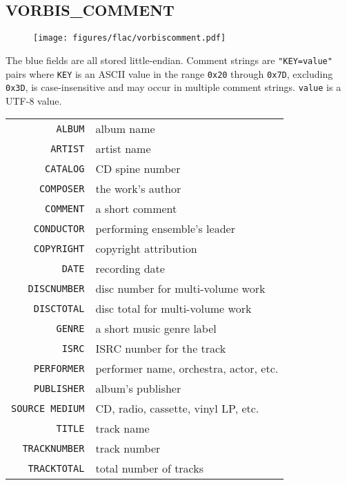 \subsection{VORBIS\_COMMENT}
\begin{figure}[h]
\texttt{[image: figures/flac/vorbiscomment.pdf]}
\end{figure}
\par
\noindent
The blue fields are all stored little-endian.
Comment strings are \texttt{"KEY=value"} pairs
where \texttt{KEY} is an ASCII value in the range \texttt{0x20}
through \texttt{0x7D}, excluding \texttt{0x3D},
is case-insensitive and may occur in multiple comment strings.
\texttt{value} is a UTF-8 value.
\begin{table}[h]
  {
    \begin{tabular}{rl}
      \texttt{ALBUM} & album name \\
      \texttt{ARTIST} & artist name \\
      \texttt{CATALOG} & CD spine number \\
      \texttt{COMPOSER} & the work's author \\
      \texttt{COMMENT} & a short comment \\
      \texttt{CONDUCTOR} & performing ensemble's leader \\
      \texttt{COPYRIGHT} & copyright attribution \\
      \texttt{DATE} & recording date \\
      \texttt{DISCNUMBER} & disc number for multi-volume work \\
      \texttt{DISCTOTAL} & disc total for multi-volume work \\
      \texttt{GENRE} & a short music genre label \\
      \texttt{ISRC} & ISRC number for the track \\
      \texttt{PERFORMER} & performer name, orchestra, actor, etc. \\
      \texttt{PUBLISHER} & album's publisher \\
      \texttt{SOURCE MEDIUM} & CD, radio, cassette, vinyl LP, etc. \\
      \texttt{TITLE} & track name \\
      \texttt{TRACKNUMBER} & track number \\
      \texttt{TRACKTOTAL} & total number of tracks \\
    \end{tabular}
  }
\end{table}

